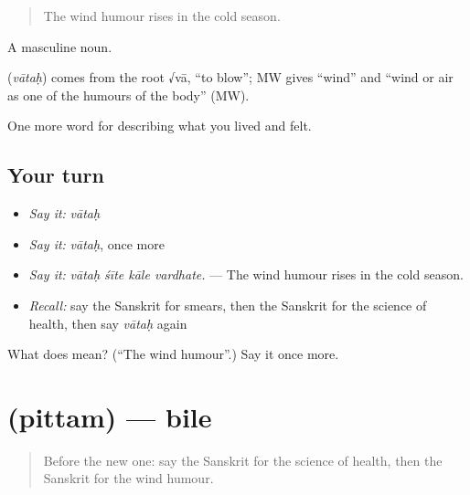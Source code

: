 \begin{quote}
The wind humour rises in the cold season.
\end{quote}

A masculine noun.

\begin{cousinweb}
\textbf{} (\emph{vātaḥ}) comes from the root √vā, \textquotedblleft{}to blow\textquotedblright{}; MW gives \textquotedblleft{}wind\textquotedblright{} and \textquotedblleft{}wind or air as one of the humours of the body\textquotedblright{} (MW).
\end{cousinweb}

\begin{grammarlens}[title={What you've built}]
One more word for describing what you lived and felt.
\end{grammarlens}

\subsection*{Your turn}
\begin{itemize}
\raggedright
  \item \emph{Say it:} \emph{vātaḥ}
  \item \emph{Say it:} \emph{vātaḥ}, once more
  \item \emph{Say it:} \emph{vātaḥ śīte kāle vardhate.} — The wind humour rises in the cold season.
  \item \emph{Recall:} say the Sanskrit for smears, then the Sanskrit for the science of health, then say \emph{vātaḥ} again
\end{itemize}

\begin{tcolorbox}[breakable,colback=teal!4,colframe=teal!35!black,title={Before you move on}]
What does  mean? (\textquotedblleft{}The wind humour\textquotedblright{}.) Say it once more.
\end{tcolorbox}
\section[\texorpdfstring{\sk{पित्तम्} (pittam)}{पित्तम् (pittam)}]{ (pittam) — bile}

\label{lesson:SA-C484-pittam}



\begin{quote}
Before the new one: say the Sanskrit for the science of health, then the Sanskrit for the wind humour.
\end{quote}

